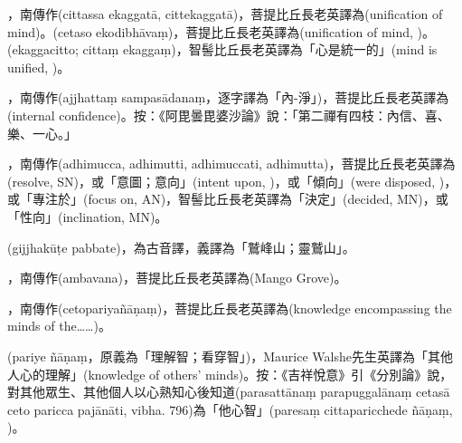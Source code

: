 \startitemgroup[noteitems]
\item{}，南傳作(cittassa ekaggatā, cittekaggatā)，菩提比丘長老英譯為(unification of mind)。(cetaso ekodibhāvaṃ)，菩提比丘長老英譯為(unification of mind, )。(ekaggacitto; cittaṃ ekaggaṃ)，智髻比丘長老英譯為「心是統一的」(mind is unified, )。
\stopitemgroup

\startitemgroup[noteitems]
\item{}，南傳作(ajjhattaṃ sampasādanaṃ，逐字譯為「內-淨」)，菩提比丘長老英譯為(internal confidence)。按：《阿毘曇毘婆沙論》說：「第二禪有四枝：內信、喜、樂、一心。」
\stopitemgroup

\startitemgroup[noteitems]
\item{}，南傳作(adhimucca, adhimutti, adhimuccati, adhimutta)，菩提比丘長老英譯為(resolve, SN)，或「意圖；意向」(intent upon, )，或「傾向」(were disposed, )，或「專注於」(focus on, AN)，智髻比丘長老英譯為「決定」(decided, MN)，或「性向」(inclination, MN)。
\stopitemgroup

\startitemgroup[noteitems]
\item{}(gijjhakūṭe pabbate)，為古音譯，義譯為「鷲峰山；靈鷲山」。
\stopitemgroup

\startitemgroup[noteitems]
\item{}，南傳作(ambavana)，菩提比丘長老英譯為(Mango Grove)。
\stopitemgroup

\startitemgroup[noteitems]
\item{}，南傳作(cetopariyañāṇaṃ)，菩提比丘長老英譯為(knowledge encompassing the minds of the……)。
\item{}(pariye ñāṇaṃ，原義為「理解智；看穿智」)，Maurice Walshe先生英譯為「其他人心的理解」(knowledge of others' minds)。按：《吉祥悅意》引《分別論》說，對其他眾生、其他個人以心熟知心後知道(parasattānaṃ parapuggalānaṃ cetasā ceto paricca pajānāti, vibha. 796)為「他心智」(paresaṃ cittaparicchede ñāṇaṃ, )。
\stopitemgroup

